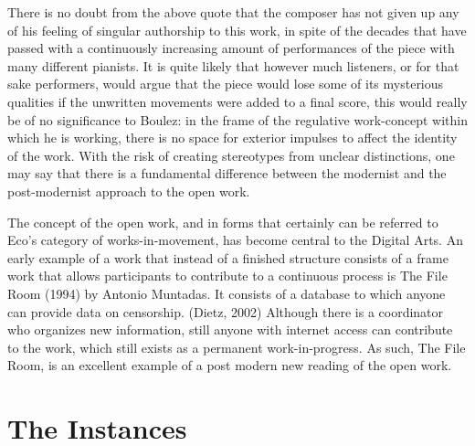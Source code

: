 There is no doubt from the above quote that the composer has not given
up any of his feeling of singular authorship to this work, in spite of
the decades that have passed with a continuously increasing amount of
performances of the piece with many different pianists. It is quite
likely that however much listeners, or for that sake performers, would
argue that the piece would lose some of its mysterious qualities if
the unwritten movements were added to a final score, this would really
be of no significance to Boulez: in the frame of the regulative
work-concept within which he is working, there is no space for
exterior impulses to affect the identity of the work. With the risk of
creating stereotypes from unclear distinctions, one may say that there
is a fundamental difference between the modernist and the
post-modernist approach to the open work.
 
The concept of the open work, and in forms that certainly can be
referred to Eco's category of works-in-movement, has become central to
the Digital Arts. An early example of a work that instead of a
finished structure consists of a frame work that allows participants
to contribute to a continuous process is The File Room (1994) by
Antonio Muntadas. It consists of a database to which anyone can
provide data on censorship. (Dietz, 2002) Although there is a
coordinator who organizes new information, still anyone with internet
access can contribute to the work, which still exists as a permanent
work-in-progress. As such, The File Room, is an excellent example of a
post modern new reading of the open work.


\section{The Instances }
\label{sec:instances-}


